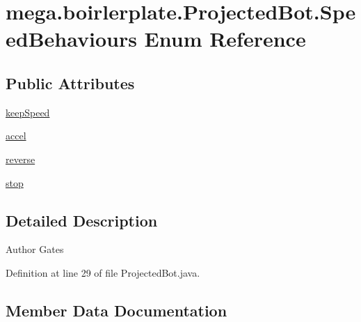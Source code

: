 \hypertarget{enummega_1_1boirlerplate_1_1_projected_bot_1_1_speed_behaviours}{}\section{mega.\+boirlerplate.\+Projected\+Bot.\+Speed\+Behaviours Enum Reference}
\label{enummega_1_1boirlerplate_1_1_projected_bot_1_1_speed_behaviours}
\subsection*{Public Attributes}
\begin{DoxyCompactItemize}
\item 
\hyperlink{enummega_1_1boirlerplate_1_1_projected_bot_1_1_speed_behaviours_a14f5975db92cf06aff37cb02c86a285f}{keep\+Speed}
\item 
\hyperlink{enummega_1_1boirlerplate_1_1_projected_bot_1_1_speed_behaviours_a973e58a11f8b9a2a0f272a0467970f92}{accel}
\item 
\hyperlink{enummega_1_1boirlerplate_1_1_projected_bot_1_1_speed_behaviours_a74646d0bad0ea87e63c87e95ac78718a}{reverse}
\item 
\hyperlink{enummega_1_1boirlerplate_1_1_projected_bot_1_1_speed_behaviours_a5797ddfe19110af68499cfd3d3400fc9}{stop}
\end{DoxyCompactItemize}


\subsection{Detailed Description}
\begin{DoxyAuthor}{Author}
Gates 
\end{DoxyAuthor}


Definition at line 29 of file Projected\+Bot.\+java.



\subsection{Member Data Documentation}
\mbox{\label{enummega_1_1boirlerplate_1_1_projected_bot_1_1_speed_behaviours_a973e58a11f8b9a2a0f272a0467970f92}} 
